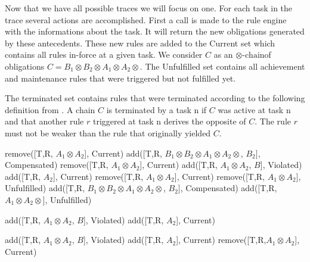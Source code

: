 \documentclass[10pt]{report}
\newcommand{\ochain}{$\otimes \text{-chain}$}
\begin{document}
Now that we have all possible traces we will focus on one. For each task in the trace several actions are accomplished. First a call is made to the rule engine with the informations about the task. It will return the new obligations generated by these antecedents. These new rules are added to the Current set which contains all rules in-force at a given task. We consider $C$ as an \ochain of obligations $C= B_{1} \otimes B_{2} \otimes A_{1} \otimes A_{2} \otimes$. The Unfulfilled set contains all achievement and maintenance rules that were triggered but not fulfilled yet.

The terminated set contains rules that were terminated according to the following definition from \autocite{ConceptuallyRichModelofBPC}. A chain $C$ is terminated by a task n if $C$ was active at task n and that another rule $r$ triggered at task n derives the opposite of $C$. The rule $r$ must not be weaker than the rule that originally yielded $C$.

\begin{algorithmic}
			\State remove([T,R, $A_{1} \otimes A_{2}$], Current)
				\State add([T,R, $B_{1} \otimes B_{2} \otimes A_{1} \otimes A_{2} \otimes$, $B_{2}]$, Compensated)
			\EndIf
		\Else 
			\State remove([T,R, $A_{1} \otimes A_{2} $], Current)
			\State add([T,R, $A_{1} \otimes A_{2}$, $B$], Violated)
			\State add([T,R, $A_{2}$], Current)
		\EndIf
	\EndIf
			\State remove([T,R, $A_{1} \otimes A_{2}$], Current)
			\State remove([T,R, $A_{1} \otimes A_{2}$], Unfulfilled)
				\State add([T,R, $B_{1} \otimes B_{2} \otimes A_{1} \otimes A_{2} \otimes$, $B_{2}]$, Compensated)
			\EndIf
		\Else
			\State add([T,R, $A_{1} \otimes A_{2} \otimes$], Unfulfilled)
		\EndIf
	\EndIf
	
			\State add([T,R, $A_{1} \otimes A_{2}$, $B$], Violated)
			\State add([T,R, $A_{2}$], Current)
		\EndIf
	\EndIf
\EndFor

\State

		\State add([T,R, $A_{1} \otimes A_{2}$, $B$], Violated)
		\State add([T,R, $A_{2}$], Current)
	\EndIf
		\State remove([T,R,$A_{1} \otimes A_{2}$], Current)
	\EndIf
\EndFor
\end{algorithmic}
\end{document}
